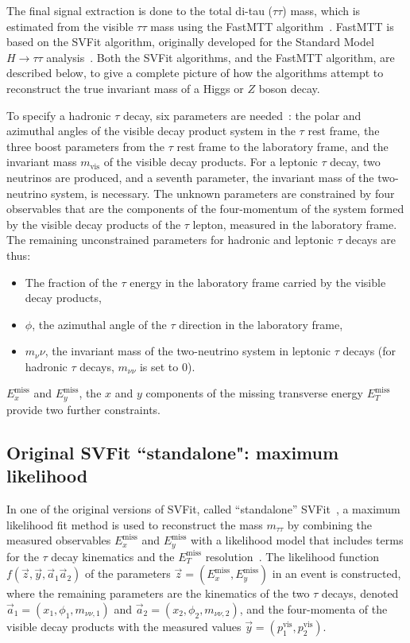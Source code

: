 The final signal extraction is done to the total di-tau ($\tau\tau$) mass, which is estimated from the visible $\tau\tau$ mass using the FastMTT algorithm~\cite{2014_SVFit_Bianchini}. FastMTT is based on the SVFit algorithm, originally developed for the Standard Model $H \rightarrow \tau\tau$ analysis~\cite{CMS-HIG-13-004}. Both the SVFit algorithms, and the FastMTT algorithm, are described below, to give a complete picture of how the algorithms attempt to reconstruct the true invariant mass of a Higgs or $Z$ boson decay.

To specify a hadronic $\tau$ decay, six parameters are needed~\cite{CMS-HIG-13-004}: the polar and azimuthal angles of the visible decay product system in the $\tau$ rest frame, the three boost parameters from the $\tau$ rest frame to the laboratory frame, and the invariant mass $m_{\text{vis}}$ of the visible decay products. For a leptonic $\tau$ decay, two neutrinos are produced, and a seventh parameter, the invariant mass of the two-neutrino system, is necessary. The unknown parameters are constrained by four observables that are the components of the four-momentum of the system formed by the visible decay products of the $\tau$ lepton, measured in the laboratory frame. The remaining unconstrained parameters for hadronic and leptonic $\tau$ decays are thus:

\begin{itemize}
    \item The fraction of the $\tau$ energy in the laboratory frame carried by the visible decay products,
    \item $\phi$, the azimuthal angle of the $\tau$ direction in the laboratory frame,
    \item $m_\nu\nu$, the invariant mass of the two-neutrino system in leptonic $\tau$ decays (for hadronic $\tau$ decays, $m_{\nu\nu}$ is set to 0).
\end{itemize}
$E_{x}^{\text{miss}}$ and $E_{y}^{\text{miss}}$, the $x$ and $y$ components of the missing transverse energy $E_{T}^{\text{miss}}$ provide two further constraints. 

\subsection{Original SVFit \texorpdfstring{``standalone"}{"standalone"}: maximum likelihood}
In one of the original versions of SVFit, called ``standalone'' SVFit~\cite{CMS-HIG-13-004}, a maximum likelihood fit method is used to reconstruct the mass $m_{\tau\tau}$ by combining the measured observables $E_{x}^{\text{miss}}$ and $E_{y}^{\text{miss}}$ with a likelihood model that includes terms for the $\tau$ decay kinematics and the $E_{T}^{\text{miss}}$ resolution~\cite{CMS-HIG-13-004}. The likelihood function $f(\vec{z}, \vec{y}, \vec{a}_1 \vec{a}_2)$ of the parameters $\vec{z} = (E_{x}^{\text{miss}}, E_{y}^{\text{miss}})$ in an event is constructed, where the remaining parameters are the kinematics of the two $\tau$ decays, denoted $\vec{a}_1 = (x_1, \phi_1, m_{\nu\nu, 1})$ and $\vec{a}_2 = (x_2, \phi_2, m_{\nu\nu, 2})$, and the four-momenta of the visible decay products with the measured values $\vec{y} = (p_1^{\text{vis}}, p_2^{\text{vis}})$.

